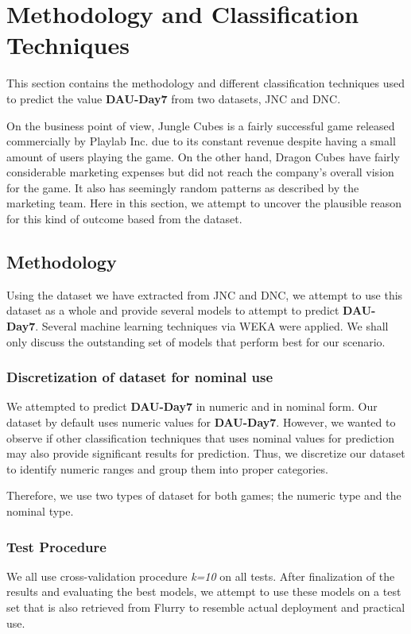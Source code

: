 \section{Methodology and Classification Techniques}
This section contains the methodology and different classification techniques used to predict the value \textbf{DAU-Day7} from two datasets, JNC and DNC.

On the business point of view, Jungle Cubes is a fairly successful game released commercially by Playlab Inc. due to its constant revenue despite having a small amount of users playing the game. On the other hand, Dragon Cubes have fairly considerable marketing expenses but did not reach the company's overall vision for the game. It also has seemingly random patterns as described by the marketing team. Here in this section, we attempt to uncover the plausible reason for this kind of outcome based from the dataset.

\subsection{Methodology}
Using the dataset we have extracted from JNC and DNC, we attempt to use this dataset as a whole and provide several models to attempt to predict \textbf{DAU-Day7}. Several machine learning techniques via WEKA were applied. We shall only discuss the outstanding set of models that perform best for our scenario.

\subsubsection{Discretization of dataset for nominal use}
We attempted to predict \textbf{DAU-Day7} in numeric and in nominal form. Our dataset by default uses numeric values for \textbf{DAU-Day7}. However, we wanted to observe if other classification techniques that uses nominal values for prediction may also provide significant results for prediction. Thus, we discretize our dataset to identify numeric ranges and group them into proper categories. 

Therefore, we use two types of dataset for both games; the numeric type and the nominal type.

\subsubsection{Test Procedure}
We all use cross-validation procedure \textit{k=10} on all tests. After finalization of the results and evaluating the best models, we attempt to use these models on a test set that is also retrieved from Flurry to resemble actual deployment and practical use.


